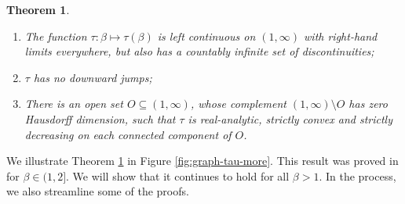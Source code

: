 \documentclass[12pt]{amsart}
\newtheorem{theorem}{Theorem}[section]
\theoremstyle{definition}
\theoremstyle{remark}
\numberwithin{equation}{section}
\begin{document}
\begin{theorem} \label{main:critical-devils-staircase}\mbox{}
\begin{enumerate}[{\rm(i)}]
\item The function $\tau: \beta\mapsto\tau(\beta)$ is left continuous on $(1,\infty)$ with right-hand limits everywhere, but also has a countably infinite set of discontinuities;
\item $\tau$ has no downward jumps;
\item There is an open set $O\subseteq (1,\infty)$, whose complement $(1,\infty)\setminus O$ has zero Hausdorff dimension, such that $\tau$ is real-analytic, strictly convex and strictly decreasing on each connected component of $O$.
\end{enumerate}
\end{theorem}

We illustrate Theorem \ref{main:critical-devils-staircase} in Figure \ref{fig:graph-tau-more}. This result was proved in \cite{Allaart-Kong-2021} for $\beta\in(1,2]$. We will show that it continues to hold for all $\beta>1$. In the process, we also streamline some of the proofs.
\end{document}
